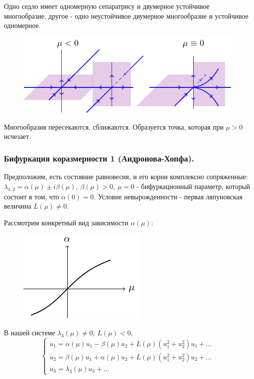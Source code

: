 Одно седло имеет одномерную сепаратрису и двумерное устойчивое многообразие, другое - одно неустойчивое двумерное многообразие и устойчивое одномерное.

\begin{figure}[H]
	\centering
	\includegraphics[scale=1.5]{img/multidimensional_dynamic_systems/2kr_3}
\end{figure}

Многообразия пересекаются, сближаются. Образуется точка, которая при $\mu>0$ исчезает.

\subsubsection{Бифуркация коразмерности 1 (Андронова-Хопфа). } Предположим, есть состояние равновесия, и  его корни комплексно сопряженные: $\lambda_{1,2}=\alpha(\mu)\pm i \beta(\mu),~\beta(\mu)>0,~\mu=0$ - бифуркационный параметр, который состоит в том, что $\alpha(0)=0$. Условие невырожденности - первая ляпуновская величина $L(\mu)\neq 0$.

Рассмотрим конкретный вид зависимости $\alpha(\mu)$:
\begin{figure}[H]
	\centering
	\includegraphics[scale=1.5]{img/multidimensional_dynamic_systems/a_mu}
\end{figure}
В нашей системе $\lambda_3(\mu)\neq 0,~L(\mu)<0$,
\begin{equation}
	\left\{\begin{aligned}
		\dot u_1 = \alpha(\mu)u_1-\beta(\mu)u_2+L(\mu)(u_1^2+u_2^2)u_1+\dots \\
		\dot u_2 = \beta(\mu)u_1+\alpha(\mu)u_2+L(\mu)(u_1^2+u_2^2)u_2+\dots \\
		\dot u_3 = \lambda_3(\mu)u_3+\dots
	\end{aligned}\right.
	\label{eq:108}	
\end{equation}

